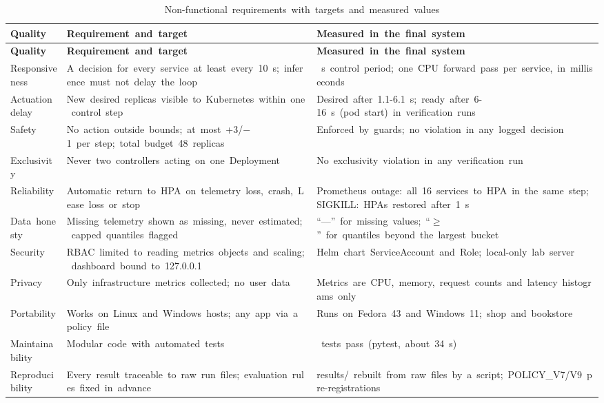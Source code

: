 \documentclass[12pt,a4paper,oneside]{report}
\begin{document}
\begingroup\small\setlength{\tabcolsep}{4pt}\renewcommand{\arraystretch}{1.25}
\begin{longtable}{|>{\raggedright\arraybackslash}p{2.62cm}|>{\raggedright\arraybackslash}p{6.11cm}|>{\raggedright\arraybackslash}p{5.82cm}|}
\caption{Non-functional~requirements~with~targets~and~measured~values}\label{tab:nfr}\\\hline
\textbf{Quality} & \textbf{Requirement~and~target} & \textbf{Measured~in~the~final~system}\\\hline\endfirsthead
\hline \textbf{Quality} & \textbf{Requirement~and~target} & \textbf{Measured~in~the~final~system}\\\hline\endhead
Responsiveness & A~decision~for~every~service~at~least~every~10~s;~inference~must~not~delay~the~loop & 10~s~control~period;~one~CPU~forward~pass~per~service,~in~milliseconds\\\hline
Actuation~delay & New~desired~replicas~visible~to~Kubernetes~within~one~control~step & Desired~after~1.1-6.1~s;~ready~after~6-16~s~(pod~start)~in~verification~runs\\\hline
Safety & No~action~outside~bounds;~at~most~+3/$-$1~per~step;~total~budget~48~replicas & Enforced~by~guards;~no~violation~in~any~logged~decision\\\hline
Exclusivity & Never~two~controllers~acting~on~one~Deployment & No~exclusivity~violation~in~any~verification~run\\\hline
Reliability & Automatic~return~to~HPA~on~telemetry~loss,~crash,~Lease~loss~or~stop & Prometheus~outage:~all~16~services~to~HPA~in~the~same~step;~SIGKILL:~HPAs~restored~after~1~s\\\hline
Data~honesty & Missing~telemetry~shown~as~missing,~never~estimated;~capped~quantiles~flagged & ``---''~for~missing~values;~``$\ge$''~for~quantiles~beyond~the~largest~bucket\\\hline
Security & RBAC~limited~to~reading~metrics~objects~and~scaling;~dashboard~bound~to~127.0.0.1 & Helm~chart~ServiceAccount~and~Role;~local-only~lab~server\\\hline
Privacy & Only~infrastructure~metrics~collected;~no~user~data & Metrics~are~CPU,~memory,~request~counts~and~latency~histograms~only\\\hline
Portability & Works~on~Linux~and~Windows~hosts;~any~app~via~a~policy~file & Runs~on~Fedora~43~and~Windows~11;~shop~and~bookstore\\\hline
Maintainability & Modular~code~with~automated~tests & 373~tests~pass~(pytest,~about~34~s)\\\hline
Reproducibility & Every~result~traceable~to~raw~run~files;~evaluation~rules~fixed~in~advance & results/~rebuilt~from~raw~files~by~a~script;~POLICY\_V7/V9~pre-registrations\\\hline
\end{longtable}\endgroup
\end{document}
